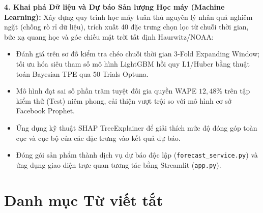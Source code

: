 \documentclass[12pt, a4paper]{report}
\begin{document}
\textbf{4. Khai phá Dữ liệu và Dự báo Sản lượng Học máy (Machine Learning):}
Xây dựng quy trình học máy tuân thủ nguyên lý nhân quả nghiêm ngặt (chống rò rỉ dữ liệu), trích xuất 40 đặc trưng chọn lọc từ chuỗi thời gian, bức xạ quang học và góc chiếu mặt trời tất định Haurwitz/NOAA:
\begin{itemize}[noitemsep]
    \item Đánh giá trên sơ đồ kiểm tra chéo chuỗi thời gian 3-Fold Expanding Window; tối ưu hóa siêu tham số mô hình LightGBM hồi quy L1/Huber bằng thuật toán Bayesian TPE qua 50 Trials Optuna.
    \item Mô hình đạt sai số phần trăm tuyệt đối gia quyền WAPE $12{,}48\%$ trên tập kiểm thử (Test) niêm phong, cải thiện vượt trội so với mô hình cơ sở Facebook Prophet.
    \item Ứng dụng kỹ thuật SHAP TreeExplainer để giải thích mức độ đóng góp toàn cục và cục bộ của các đặc trưng vào kết quả dự báo.
    \item Đóng gói sản phẩm thành dịch vụ dự báo độc lập (\texttt{forecast\_service.py}) và ứng dụng giao diện trực quan tương tác bằng Streamlit (\texttt{app.py}).
\end{itemize}

\newpage

\tableofcontents
\listoffigures
\listoftables

\newpage
\chapter*{Danh mục Từ viết tắt}
\vspace*{-15pt}
\end{document}
